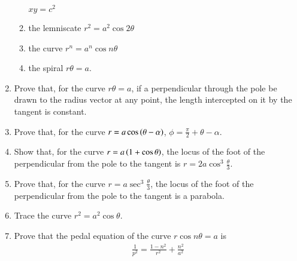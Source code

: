 \begin{enumerate}[label=\arabic*.,ref=\thesubsection.\theenumi]
\begin{enumerate}
$
xy = c^2
$
\item the lemniscate 
$
r^2=a^2\cos2\theta
$
\item the curve 
$
r^n = a^n\cos n\theta
$
\item the spiral
$
r\theta = a.
$
\end{enumerate}
\item Prove that, for the curve $r\theta = a$, if a perpendicular through the pole be drawn
to the radius vector at any point, the length intercepted on it by the tangent
is constant.  
\item Prove that, for the curve $r = a \cos\left(\theta-\alpha\right)$, $\phi = \frac{\pi}{2}+\theta-\alpha$.
\item Show that, for the curve $r = a\left(1+\cos\theta\right)$, the locus of the foot of the perpendicular from the pole to the tangent is 
$r = 2a\cos^3\frac{\theta}{3}$.
\item Prove that, for the curve $r = a\sec^3\frac{\theta}{3}$, the locus of the foot of the perpendicular from the pole to the tangent
is a parabola.
\item Trace the curve $r^2=a^2\cos\theta$.
\item Prove that the pedal equation of the curve $r\cos n\theta = a$ is
\begin{align*}
\frac{1}{p^2} = \frac{1-n^2}{r^2}+\frac{n^2}{a^2}
\end{align*}
\end{enumerate}
